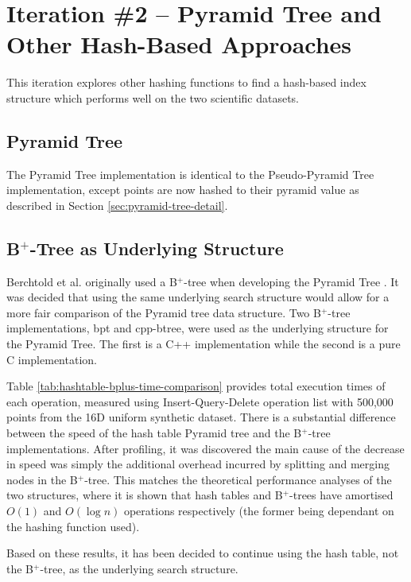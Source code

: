 \section{Iteration \#2 -- Pyramid Tree and Other Hash-Based Approaches}
\label{sec:iteration2}

This iteration explores other hashing functions to find a hash-based index structure which performs well on the two scientific datasets.

\subsection{Pyramid Tree}

The Pyramid Tree implementation is identical to the Pseudo-Pyramid Tree implementation, except points are now hashed to their pyramid value as described in Section \ref{sec:pyramid-tree-detail}.

\subsection{B${}^+$-Tree as Underlying Structure}

Berchtold et al. originally used a B${}^{+}$-tree when developing the Pyramid Tree \cite{pyramid-tree}. It was decided that using the same underlying search structure would allow for a more fair comparison of the Pyramid tree data structure. Two B${}^{+}$-tree implementations, bpt\cite{bpt} and cpp-btree\cite{cpp-btree}, were used as the underlying structure for the Pyramid Tree. The first is a C++ implementation while the second is a pure C implementation.

Table \ref{tab:hashtable-bplus-time-comparison} provides total execution times of each operation, measured using Insert-Query-Delete operation list with 500,000 points from the 16D uniform synthetic dataset. There is a substantial difference between the speed of the hash table Pyramid tree and the B${}^{+}$-tree implementations. After profiling, it was discovered the main cause of the decrease in speed was simply the additional overhead incurred by splitting and merging nodes in the B${}^{+}$-tree. This matches the theoretical performance analyses of the two structures, where it is shown that hash tables and B${}^{+}$-trees have amortised $O(1)$ and $O(\log n)$ operations respectively (the former being dependant on the hashing function used).

Based on these results, it has been decided to continue using the hash table, not the B${}^{+}$-tree, as the underlying search structure.

